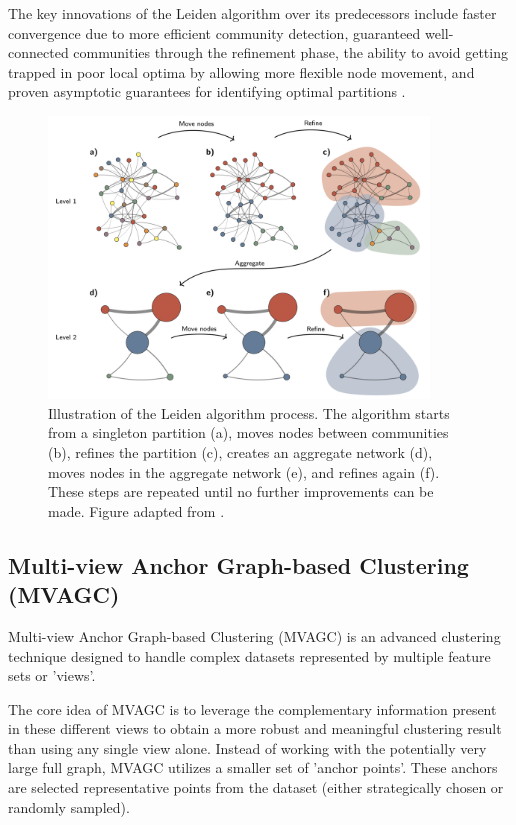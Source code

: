 The key innovations of the Leiden algorithm over its predecessors include faster convergence due to more efficient community detection, guaranteed well-connected communities through the refinement phase, the ability to avoid getting trapped in poor local optima by allowing more flexible node movement, and proven asymptotic guarantees for identifying optimal partitions \cite{leiden}.

\begin{figure}[h]
    \centering
    \includegraphics[width=0.9\textwidth]{img/Leiden_example.png}
    \caption{Illustration of the Leiden algorithm process. The algorithm starts from a singleton partition (a), moves nodes between communities (b), refines the partition (c), creates an aggregate network (d), moves nodes in the aggregate network (e), and refines again (f). These steps are repeated until no further improvements can be made. Figure adapted from \cite{leiden}.}
    \label{fig:leiden_algorithm}
\end{figure}

\subsection{Multi-view Anchor Graph-based Clustering (MVAGC)}
\label{subsec:MVAGC}

Multi-view Anchor Graph-based Clustering (MVAGC) is an advanced clustering technique designed to handle complex datasets represented by multiple feature sets or 'views'. 

The core idea of MVAGC is to leverage the complementary information present in these different views to obtain a more robust and meaningful clustering result than using any single view alone. Instead of working with the potentially very large full graph, MVAGC utilizes a smaller set of 'anchor points'. These anchors are selected representative points from the dataset (either strategically chosen or randomly sampled).


